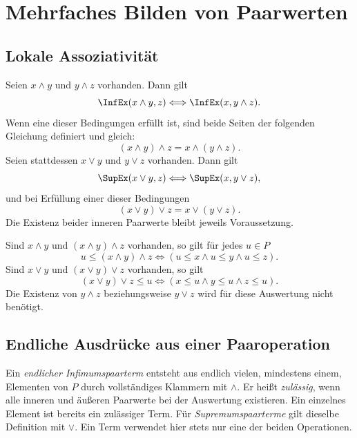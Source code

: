 \chapter{Mehrfaches Bilden von Paarwerten}
\label{b14guide:ch:iteration}

\section{Lokale Assoziativität}

\begin{theorem}
\label{b14guide:thm:associative}
Seien $x\wedge y$ und $y\wedge z$ vorhanden. Dann gilt
\[
 \InfEx(x\wedge y,z)\Longleftrightarrow\InfEx(x,y\wedge z).
\]
Wenn eine dieser Bedingungen erfüllt ist, sind beide Seiten
der folgenden Gleichung definiert und gleich:
\[
 (x\wedge y)\wedge z=x\wedge(y\wedge z).
\]
Seien stattdessen $x\vee y$ und $y\vee z$ vorhanden. Dann gilt
\[
 \SupEx(x\vee y,z)\Longleftrightarrow\SupEx(x,y\vee z),
\]
und bei Erfüllung einer dieser Bedingungen
\[
 (x\vee y)\vee z=x\vee(y\vee z).
\]
Die Existenz beider inneren Paarwerte bleibt jeweils Voraussetzung.
\end{theorem}

\begin{theorem}
\label{b14guide:thm:triple}
Sind $x\wedge y$ und $(x\wedge y)\wedge z$ vorhanden, so gilt
für jedes $u\in P$
\[
 u\leq(x\wedge y)\wedge z
 \Longleftrightarrow (u\leq x\land u\leq y\land u\leq z).
\]
Sind $x\vee y$ und $(x\vee y)\vee z$ vorhanden, so gilt
\[
 (x\vee y)\vee z\leq u
 \Longleftrightarrow (x\leq u\land y\leq u\land z\leq u).
\]
Die Existenz von $y\wedge z$ beziehungsweise $y\vee z$
wird für diese Auswertung nicht benötigt.
\end{theorem}

\section{Endliche Ausdrücke aus einer Paaroperation}

\begin{definition}
\label{b14guide:def:term}
Ein \emph{endlicher Infimumspaarterm} entsteht aus endlich vielen,
mindestens einem, Elementen von $P$ durch vollständiges
Klammern mit $\wedge$. Er heißt \emph{zulässig}, wenn alle
inneren und äußeren Paarwerte bei der Auswertung existieren.
Ein einzelnes Element ist bereits ein zulässiger Term.
Für \emph{Supremumspaarterme} gilt dieselbe Definition mit $\vee$.
Ein Term verwendet hier stets nur eine der beiden Operationen.
\end{definition}

